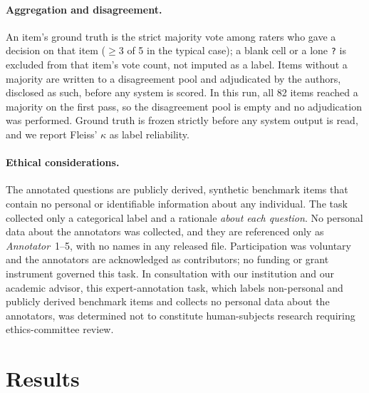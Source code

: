 \documentclass[sigconf,anonymous]{acmart}
\begin{document}
\paragraph{Aggregation and disagreement.}
An item's ground truth is the strict majority vote among raters who gave a decision on that item ($\ge 3$ of 5 in the typical case); a blank cell or a lone \texttt{?} is excluded from that item's vote count, not imputed as a label. Items without a majority are written to a disagreement pool and adjudicated by the authors, disclosed as such, before any system is scored. In this run, all 82 items reached a majority on the first pass, so the disagreement pool is empty and no adjudication was performed. Ground truth is frozen strictly before any system output is read, and we report Fleiss' $\kappa$ as label reliability.

\paragraph{Ethical considerations.}
The annotated questions are publicly derived, synthetic benchmark items that contain no personal or identifiable information about any individual. The task collected only a categorical label and a rationale \emph{about each question}. No personal data about the annotators was collected, and they are referenced only as \textit{Annotator}~1--5, with no names in any released file.
Participation was voluntary and the annotators are acknowledged as contributors; no funding or grant instrument governed this task.
In consultation with our institution and our academic advisor, this expert-annotation task, which labels non-personal and publicly derived benchmark items and collects no personal data about the annotators, was determined not to constitute human-subjects research requiring ethics-committee review.

\section{Results}\label{sec:v2res}
\end{document}

